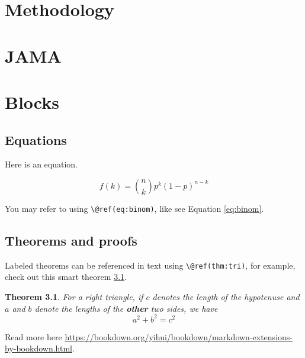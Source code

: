 \documentclass[
]{book}
\newtheorem{theorem}{Theorem}[chapter]
\theoremstyle{definition}
\theoremstyle{definition}
\theoremstyle{definition}
\theoremstyle{definition}
\theoremstyle{remark}
\begin{document}
\hypertarget{methodology}{%
\chapter{Methodology}\label{methodology}}

\hypertarget{section-1}{%
\section{}\label{section-1}}

\hypertarget{jama}{%
\chapter{JAMA}\label{jama}}

\hypertarget{blocks}{%
\chapter{Blocks}\label{blocks}}

\hypertarget{equations}{%
\section{Equations}\label{equations}}

Here is an equation.

\begin{equation} 
  f\left(k\right) = \binom{n}{k} p^k\left(1-p\right)^{n-k}
  \label{eq:binom}
\end{equation}

You may refer to using \texttt{\textbackslash{}@ref(eq:binom)}, like see Equation \eqref{eq:binom}.

\hypertarget{theorems-and-proofs}{%
\section{Theorems and proofs}\label{theorems-and-proofs}}

Labeled theorems can be referenced in text using \texttt{\textbackslash{}@ref(thm:tri)}, for example, check out this smart theorem \ref{thm:tri}.

\begin{theorem}
\protect\hypertarget{thm:tri}{}\label{thm:tri}For a right triangle, if \(c\) denotes the \emph{length} of the hypotenuse
and \(a\) and \(b\) denote the lengths of the \textbf{other} two sides, we have
\[a^2 + b^2 = c^2\]
\end{theorem}

Read more here \url{https://bookdown.org/yihui/bookdown/markdown-extensions-by-bookdown.html}.
\end{document}
